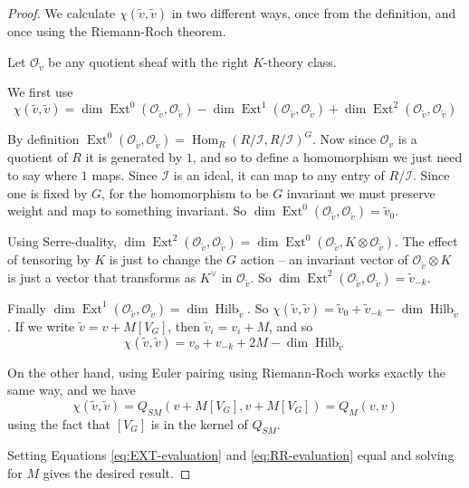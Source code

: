 \documentclass{amsart}[12pt]
\theoremstyle{definition}
\newcommand{\OO}{\mathcal{O}}
\DeclareMathOperator{\Hilb}{Hilb}
\DeclareMathOperator{\Ext}{Ext}
\DeclareMathOperator{\Hom}{Hom}
\begin{document}
\begin{proof}
We calculate $\chi(\tilde{v},\tilde{v})$ in two different ways, once from the definition, and once using the Riemann-Roch theorem.

Let $\OO_{\tilde{v}}$ be any quotient sheaf with the right $K$-theory class.  

We first use
$$\chi(\tilde{v}, \tilde{v})=\dim\Ext^0(\OO_{\tilde{v}},\OO_{\tilde{v}})-\dim\Ext^1(\OO_{\tilde{v}},\OO_{\tilde{v}})+\dim\Ext^2(\OO_{\tilde{v}},\OO_{\tilde{v}})$$

By definition $\Ext^0(\OO_{\tilde{v}},\OO_{\tilde{v}})=\Hom_R(R/\mathcal{I},R/\mathcal{I})^G$.  Now since $\OO_v$ is a quotient of $R$ it is generated by $1$, and so to define a homomorphism we just need to say where $1$ maps. Since $\mathcal{I}$ is an ideal, it can map to any entry of $R/\mathcal{I}$.  Since one is fixed by $G$, for the homomorphism to be $G$ invariant we must preserve weight and map to something invariant.  So $\dim\Ext^0(\OO_{\tilde{v}},\OO_{\tilde{v}})=\tilde{v}_0$.  

Using Serre-duality, $\dim\Ext^2(\OO_{\tilde{v}},\OO_{\tilde{v}})=\dim\Ext^0(\OO_{\tilde{v}},K\otimes\OO_{\tilde{v}})$.  The effect of tensoring by $K$ is just to change the $G$ action -- an invariant vector of $\OO_{\tilde{v}}\otimes K$ is just a vector that transforms as $K^\vee$ in $\OO_{\tilde{v}}$.  
So $\dim\Ext^2(\OO_{\tilde{v}},\OO_{\tilde{v}})=\tilde{v}_{-k}$.  

Finally $\dim\Ext^1(\OO_{\tilde{v}},\OO_{\tilde{v}})=\dim\Hilb_{\tilde{v}}$.  So $\chi(\tilde{v},\tilde{v})=\tilde{v}_0+\tilde{v}_{-k}-\dim\Hilb_{\tilde{v}}$.  If we write $\tilde{v}=v+M [V_G]$, then $\tilde{v}_i=v_i+M$, and so  
\begin{equation} \label{eq:EXT-evaluation}
\chi(\tilde{v},\tilde{v})=v_o+v_{-k}+2M-\dim\Hilb_{\tilde{v}} 
\end{equation}

On the other hand, using Euler pairing using Riemann-Roch works exactly the same way, and we have
\begin{equation} \label{eq:RR-evaluation}
\chi(\tilde{v},\tilde{v})=Q_{SM}(v+M[V_G],v+M[V_G])=Q_M(v,v)
\end{equation}
using the fact that $[V_G]$ is in the kernel of $Q_{SM}$.  

Setting Equations \ref{eq:EXT-evaluation} and \ref{eq:RR-evaluation} equal and solving for $M$ gives the desired result.

\end{proof}
\end{document}

